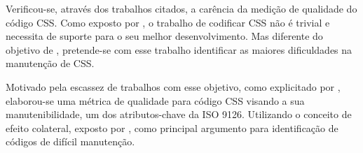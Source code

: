 Verificou-se, através dos trabalhos citados, a carência da medição de qualidade do código CSS. Como exposto por , o trabalho de codificar CSS não é trivial e necessita de suporte para o seu melhor desenvolvimento. Mas diferente do objetivo de , pretende-se com esse trabalho identificar as maiores dificuldades na manutenção de CSS. 

Motivado pela escassez de trabalhos com esse objetivo, como explicitado por , elaborou-se uma métrica de qualidade para código CSS visando a sua manutenibilidade, um dos atributos-chave da ISO 9126. Utilizando o conceito de efeito colateral, exposto por , como principal argumento para identificação de códigos de difícil manutenção.